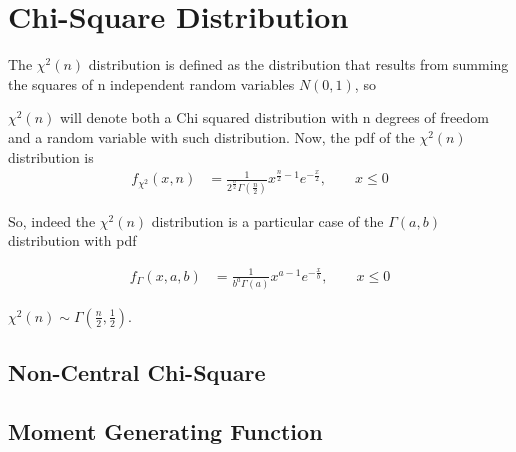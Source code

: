 
 \section{Chi-Square Distribution}
 
The $\chi^2(n)$ distribution is defined as the distribution that results from summing the squares of n independent random variables $N(0,1)$, so

$\chi^2(n)$ will denote both a Chi squared distribution with n degrees of freedom and a random variable with such distribution. Now, the pdf of the $\chi^2(n)$
 distribution is
 	\begin{align*}
		f_{\chi^2} (x, n) &= \frac{1}{2^{\frac{n}{2}} \Gamma(\frac{n}{2})} x^{\frac{n}{2} -1} e^{-\frac{x}{2}}, \qquad x \leq 0
	\end{align*}
 
 So, indeed the $\chi^2(n)$ distribution is a particular case of the $\Gamma(a, b)$ distribution with pdf
 
 	\begin{align*}
		f_{\Gamma} (x, a, b) &= \frac{1}{b^{a} \Gamma(a)} x^{a -1} e^{-\frac{x}{b}}, \qquad x \leq 0
	\end{align*} 
 
 $\chi^2(n) \sim \Gamma(\frac{n}{2}, \frac{1}{2})$.
 
\subsection{Non-Central Chi-Square}



\subsection{Moment Generating Function}

